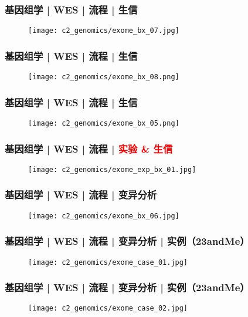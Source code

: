 \begin{frame}
  \frametitle{基因组学 | WES | 流程 | 生信}
  \begin{figure}
    \centering
    \texttt{[image: c2\_genomics/exome\_bx\_07.jpg]}
  \end{figure}
\end{frame}

\begin{frame}
  \frametitle{基因组学 | WES | 流程 | 生信}
  \begin{figure}
    \centering
    \texttt{[image: c2\_genomics/exome\_bx\_08.png]}
  \end{figure}
\end{frame}

\begin{frame}
  \frametitle{基因组学 | WES | 流程 | 生信}
  \begin{figure}
    \centering
    \texttt{[image: c2\_genomics/exome\_bx\_05.png]}
  \end{figure}
\end{frame}

\begin{frame}
  \frametitle{基因组学 | WES | 流程 | \textcolor{red}{实验 \& 生信}}
  \begin{figure}
    \centering
    \texttt{[image: c2\_genomics/exome\_exp\_bx\_01.jpg]}
  \end{figure}
\end{frame}

\begin{frame}
  \frametitle{基因组学 | WES | 流程 | 变异分析}
  \begin{figure}
    \centering
    \texttt{[image: c2\_genomics/exome\_bx\_06.jpg]}
  \end{figure}
\end{frame}

\begin{frame}
  \frametitle{基因组学 | WES | 流程 | 变异分析 | 实例（23andMe）}
  \begin{figure}
    \centering
    \texttt{[image: c2\_genomics/exome\_case\_01.jpg]}
  \end{figure}
\end{frame}

\begin{frame}
  \frametitle{基因组学 | WES | 流程 | 变异分析 | 实例（23andMe）}
  \begin{figure}
    \centering
    \texttt{[image: c2\_genomics/exome\_case\_02.jpg]}
  \end{figure}
\end{frame}

